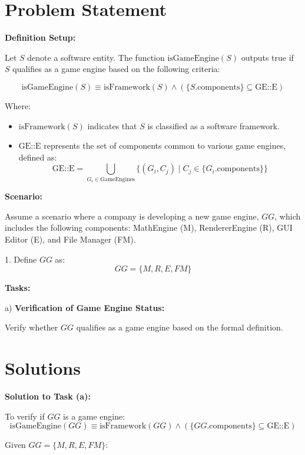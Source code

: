 








\section*{Problem Statement}

\textbf{Definition Setup:}

Let \( S \) denote a software entity. The function \( \text{isGameEngine}(S) \) outputs true if \( S \) qualifies as a game engine based on the following criteria:

\[
\text{isGameEngine}(S) \equiv \text{isFramework}(S) \land (\{ S.\text{components} \} \subseteq \text{GE::E})
\]

Where:
\begin{itemize}
    \item \( \text{isFramework}(S) \) indicates that \( S \) is classified as a software framework.
    \item \( \text{GE::E} \) represents the set of components common to various game engines, defined as:
    \[
    \text{GE::E} = \bigcup_{G_i \in \text{GameEngines}} \{ (G_i, C_j) \mid C_j \in \{ G_i.\text{components} \} \}
    \]
\end{itemize}

\textbf{Scenario:}

Assume a scenario where a company is developing a new game engine, \( GG \), which includes the following components: MathEngine (M), RendererEngine (R), GUI Editor (E), and File Manager (FM).

1. Define \( GG \) as:
\[
GG = \{ M, R, E, FM \}
\]

\textbf{Tasks:}

a) \textbf{Verification of Game Engine Status:}

Verify whether \( GG \) qualifies as a game engine based on the formal definition.


\section*{Solutions}

\textbf{Solution to Task (a):}

To verify if \( GG \) is a game engine:
\[
\text{isGameEngine}(GG) \equiv \text{isFramework}(GG) \land (\{ GG.\text{components} \} \subseteq \text{GE::E})
\]

Given \( GG = \{ M, R, E, FM \} \):

